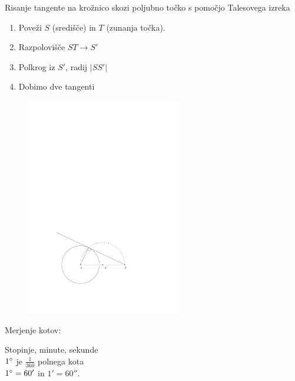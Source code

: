 \documentclass{article}
\begin{document}
Risanje tangente na krožnico skozi poljubno točko s pomočjo Talesovega izreka
\begin{enumerate}[i]
    \item Poveži $S$ (središče) in $T$ (zunanja točka).
    \item Razpolovišče $ST\rightarrow S'$
    \item Polkrog iz $S'$, radij $|SS'|$
    \item Dobimo dve tangenti
\end{enumerate}
\begin{figure}[H]
    \includegraphics[width=0.6\textwidth]{risanje_tangente.pdf}
    \centering
\end{figure}

Merjenje kotov:

Stopinje, minute, sekunde\\
$1\degree$ je $\frac{1}{360}$ polnega kota\\
$1\degree=60'$ in $1'=60''$.
\end{document}
